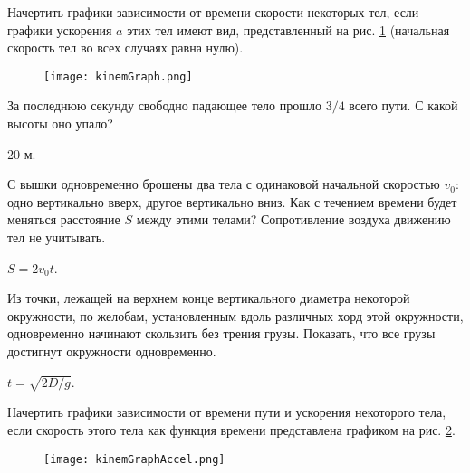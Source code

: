 \begin{ex} %
Начертить графики зависимости от времени скорости некоторых тел, если графики ускорения $a$ этих тел имеют вид, представленный на рис. \ref{kinemGraph} (начальная скорость тел во всех случаях равна нулю).

\begin{figure}[h]
\centering
\texttt{[image: kinemGraph.png]}
\caption{}
\label{kinemGraph}
\end{figure}
\begin{ans}
\end{ans}
\end{ex}

\begin{ex} %
За последнюю секунду свободно падающее тело прошло $3/4$ всего пути. С какой высоты оно упало?
\begin{ans}
20 м.
\end{ans}
\end{ex}

\begin{ex} %
С вышки одновременно брошены два тела с одинаковой начальной скоростью $v_0$: одно вертикально вверх, другое вертикально вниз. Как с течением времени будет меняться расстояние $S$ между этими телами? Сопротивление воздуха движению тел не учитывать.
\begin{ans}
$S = 2 v_0 t$.
\end{ans}
\end{ex}

\begin{ex} %
Из точки, лежащей на верхнем конце вертикального диаметра некоторой окружности, по желобам, установленным вдоль различных хорд этой окружности, одновременно начинают скользить без трения грузы. Показать, что все грузы достигнут окружности одновременно.
\begin{ans}
$t = \sqrt{2D/g}$.
\end{ans}
\end{ex}

\begin{ex} %
Начертить графики зависимости от времени пути и ускорения некоторого тела, если скорость этого тела как функция времени представлена графиком на рис. \ref{kinemGraphAccel}.

\begin{figure}
\centering
\texttt{[image: kinemGraphAccel.png]}
\caption{}
\label{kinemGraphAccel}
\end{figure}
\begin{ans}
\end{ans}
\end{ex}

